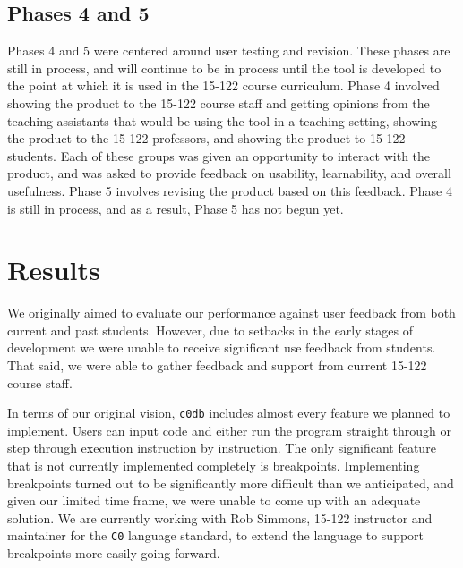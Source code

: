 \documentclass[11pt]{article}
\begin{document}
\subsection{Phases 4 and 5}
Phases 4 and 5 were centered around user testing and revision. These phases
are still in process, and will continue to be in process until the tool is
developed to the point at which it is used in the 15-122 course curriculum.
Phase 4 involved showing the product to the 15-122 course staff and getting
opinions from the teaching assistants that would be using the tool in a
teaching setting, showing the product to the 15-122 professors, and showing
the product to 15-122 students. Each of these groups was given an opportunity
to interact with the product, and was asked to provide feedback on usability,
learnability, and overall usefulness. Phase 5 involves revising the product
based on this feedback. Phase 4 is still in process, and as a result, Phase 5
has not begun yet.

\section{Results}
We originally aimed to evaluate our performance against user feedback from both
current and past students. However, due to setbacks in the early stages of
development we were unable to receive significant use feedback from students.
That said, we were able to gather feedback and support from current 15-122
course staff.
\par
In terms of our original vision, {\tt c0db} includes almost every feature we
planned to implement. Users can input code and either run the program straight
through or step through execution instruction by instruction. The only
significant feature that is not currently implemented completely is breakpoints.
Implementing breakpoints turned out to be significantly more difficult than we
anticipated, and given our limited time frame, we were unable to come up with an
adequate solution. We are currently working with Rob Simmons, 15-122 instructor
and maintainer for the {\tt C0} language standard, to extend the language to
support breakpoints more easily going forward.
\end{document}
